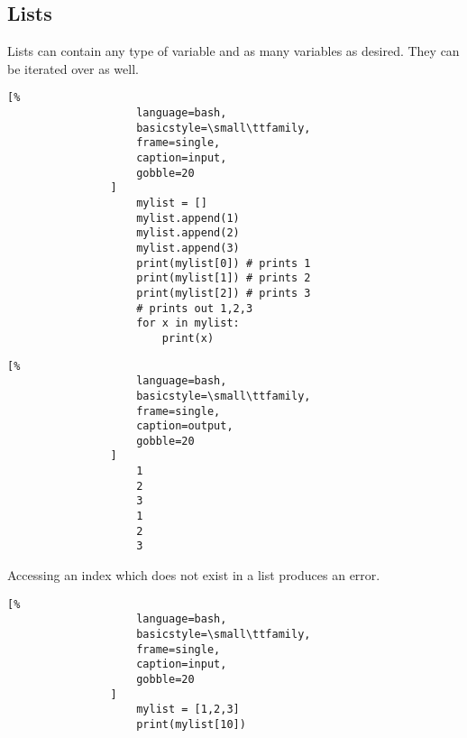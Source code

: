 \documentclass[crop=false,class=book]{standalone}
\begin{document}
        \subsection{Lists}
            Lists can contain any type of variable and as many
            variables as desired. They can be iterated over as
            well.\newline
            \begin{minipage}[t]{.48\textwidth}
                \centering
                \begin{lstlisting}[%
                    language=bash,
                    basicstyle=\small\ttfamily,
                    frame=single,
                    caption=input,
                    gobble=20
                ]
                    mylist = []
                    mylist.append(1)
                    mylist.append(2)
                    mylist.append(3)
                    print(mylist[0]) # prints 1
                    print(mylist[1]) # prints 2
                    print(mylist[2]) # prints 3
                    # prints out 1,2,3
                    for x in mylist:
                        print(x)
                \end{lstlisting}
            \end{minipage}\hfill
            \begin{minipage}[t]{.48\textwidth}
                \centering
                \begin{lstlisting}[%
                    language=bash,
                    basicstyle=\small\ttfamily,
                    frame=single,
                    caption=output,
                    gobble=20
                ]
                    1
                    2
                    3
                    1
                    2
                    3
                \end{lstlisting}
            \end{minipage}
            Accessing an index which does not exist in a
            list produces an error.\newline
            \begin{minipage}[t]{.48\textwidth}
                \centering
                \begin{lstlisting}[%
                    language=bash,
                    basicstyle=\small\ttfamily,
                    frame=single,
                    caption=input,
                    gobble=20
                ]
                    mylist = [1,2,3]
                    print(mylist[10])
                \end{lstlisting}
            \end{minipage}\hfill
\end{document}
